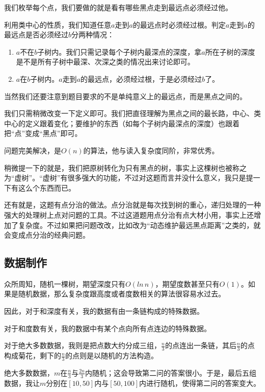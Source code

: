 \documentclass{ctexart}
\begin{document}
			我们枚举每个点，我们要做的就是看有哪些黑点走到最远点必须经过他。

			利用类中心的性质，我们知道任意$a$走到$a$的最远点时必须经过根。判定$a$走到$a$的最远点是否必须经过$b$分两种情况：
		
			\begin{enumerate}
			\item $a$不在$b$子树内。我们只需记录每个子树内最深点的深度，拿$a$所在子树的深度是不是所有子树中最深、次深之类的情况出来讨论即可。
			\item $a$在$b$子树内。$a$走到$a$的最远点，必须经过根，于是必须经过$b$了。
			\end{enumerate}

			当然我们还要注意到题目要求的不是单纯意义上的最远点，而是黑点之间的。	

			我们只需稍微改变一下定义即可。我们把直径理解为黑点之间的最长路，中心、类中心的定义跟着变化；要维护的东西（如每个子树内最深点的深度）也跟着把``点''变成``黑点''即可。

			问题完美解决，是$O(n)$的算法，他与读入复杂度同阶，非常优秀。

			稍微提一下的就是，我们把原树转化为只有黑点的树，事实上这棵树也被称之为``虚树''。``虚树''有很多强大的功能，不过对这题而言并没什么意义，我只是提一下有这么个东西而已。

			还有就是，这题有点分治的做法。点分治就是每次找到树的重心，递归处理的一种强大的处理树上点对问题的工具。不过这道题用点分治有点大材小用，事实上还增加了复杂度。不过如果把问题改改，比如改为``动态维护最远黑点距离''之类的，就会变成点分治的经典问题。

		\subsection{数据制作}
			众所周知，随机一棵树，期望深度只有$O(ln\,n)$，期望度数甚至只有$O(1)$。如果是随机数据，那么复杂度跟高度或者度数相关的算法很容易水过去。

			因此，对于和深度有关，我的数据有由一条链构成的特殊数据。

			对于和度数有关，我的数据中有某个点向所有点连边的特殊数据。

			对于绝大多数数据，我则是把点数大约分成三组，$\frac{n}{3}$的点连出一条链，其后$\frac{n}{3}$的点构成菊花，剩下的$\frac{n}{3}$的点则是以随机的方法构造。

			绝大多数数据，$m$在$\frac{n}{3}$与$\frac{2n}{3}$内随机；这会导致第二问的答案很小。于是，最后五组数据，我让$m$分别在$[10,50]$内与$[50,100]$内进行随机，使得第二问的答案变大。
\end{document}
